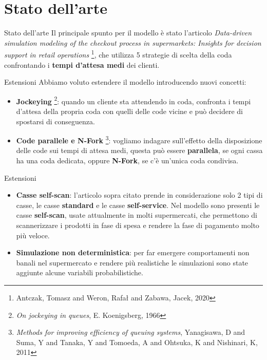 \section{Stato dell'arte}
\begin{frame}{Stato dell'arte}
	Il principale spunto per il modello è stato l'articolo \textit{Data-driven simulation modeling of the checkout process in supermarkets: Insights for decision support in retail operations} \footnote{Antczak, Tomasz and Weron, Rafał and Zabawa, Jacek, 2020}, che utilizza 5 strategie di scelta della coda confrontando i \textbf{tempi d'attesa medi} dei clienti.
\end{frame}

\begin{frame}{Estensioni}
	Abbiamo voluto estendere il modello introducendo nuovi concetti:
	
	\begin{itemize}
		\item \textbf{Jockeying} \footnote{\textit{On jockeying in queues}, E. Koenigsberg, 1966}: quando un cliente sta attendendo in coda, confronta i tempi d'attesa della propria coda con quelli delle code vicine e può decidere di spostarsi di conseguenza.
		\item \textbf{Code parallele e N-Fork} \footnote{\textit{Methods for improving efficiency of queuing systems}, Yanagisawa, D and Suma, Y and Tanaka, Y and Tomoeda, A and Ohtsuka, K and Nishinari, K, 2011}: vogliamo indagare sull'effetto della disposizione delle code sui tempi di attesa medi, questa può essere \textbf{parallela}, se ogni cassa ha una coda dedicata, oppure \textbf{N-Fork}, se c'è un'unica coda condivisa.
	\end{itemize}
\end{frame}

\begin{frame}{Estensioni}
	\begin{itemize}
		\item \textbf{Casse self-scan}: l'articolo sopra citato prende in considerazione solo 2 tipi di casse, le casse \textbf{standard} e le casse \textbf{self-service}. Nel modello sono presenti le casse \textbf{self-scan}, usate attualmente in molti supermercati, che permettono di scannerizzare i prodotti in fase di spesa e rendere la fase di pagamento molto più veloce.
		\item \textbf{Simulazione non deterministica}: per far emergere comportamenti non banali nel supermercato e rendere più realistiche le simulazioni sono state aggiunte alcune variabili probabilistiche.
	\end{itemize}
\end{frame}